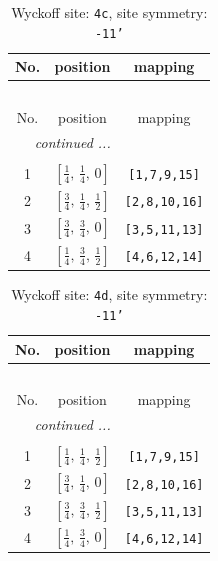 \documentclass[fleqn,8pt]{jsarticle}
\begin{document}
\renewcommand{\arraystretch}{1.2}
\begin{longtable}{ccc}
\caption{Wyckoff site: {\tt 4c}, site symmetry: {\tt -11'}}
 \\
 \hline \hline
No. & position & mapping \\ \hline \endfirsthead

\multicolumn{2}{l}{\tablename\ \thetable{}} \\
 \hline \hline
No. & position & mapping \\ \hline \endhead

 \hline \hline
\multicolumn{2}{r}{\footnotesize\it continued ...} \\ \endfoot

 \hline \hline
\multicolumn{2}{r}{} \\ \endlastfoot

1 & $\left[ \frac{1}{4},\, \frac{1}{4},\, 0 \right]$ & {\tt [1,7,9,15]} \\ \hline
2 & $\left[ \frac{3}{4},\, \frac{1}{4},\, \frac{1}{2} \right]$ & {\tt [2,8,10,16]} \\ \hline
3 & $\left[ \frac{3}{4},\, \frac{3}{4},\, 0 \right]$ & {\tt [3,5,11,13]} \\ \hline
4 & $\left[ \frac{1}{4},\, \frac{3}{4},\, \frac{1}{2} \right]$ & {\tt [4,6,12,14]} \\
\end{longtable}
\renewcommand{\arraystretch}{1.2}
\begin{longtable}{ccc}
\caption{Wyckoff site: {\tt 4d}, site symmetry: {\tt -11'}}
 \\
 \hline \hline
No. & position & mapping \\ \hline \endfirsthead

\multicolumn{2}{l}{\tablename\ \thetable{}} \\
 \hline \hline
No. & position & mapping \\ \hline \endhead

 \hline \hline
\multicolumn{2}{r}{\footnotesize\it continued ...} \\ \endfoot

 \hline \hline
\multicolumn{2}{r}{} \\ \endlastfoot

1 & $\left[ \frac{1}{4},\, \frac{1}{4},\, \frac{1}{2} \right]$ & {\tt [1,7,9,15]} \\ \hline
2 & $\left[ \frac{3}{4},\, \frac{1}{4},\, 0 \right]$ & {\tt [2,8,10,16]} \\ \hline
3 & $\left[ \frac{3}{4},\, \frac{3}{4},\, \frac{1}{2} \right]$ & {\tt [3,5,11,13]} \\ \hline
4 & $\left[ \frac{1}{4},\, \frac{3}{4},\, 0 \right]$ & {\tt [4,6,12,14]} \\
\end{longtable}
\end{document}
